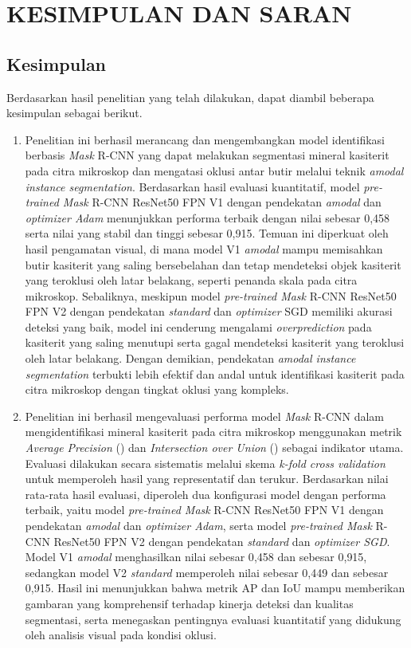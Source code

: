 \newpage
\chapter{KESIMPULAN DAN SARAN} \label{Bab V}

\section{Kesimpulan} \label{V.Kesimpulan}
Berdasarkan hasil penelitian yang telah dilakukan, dapat diambil beberapa kesimpulan sebagai berikut.

\begin{enumerate}[noitemsep]
    \item Penelitian ini berhasil merancang dan mengembangkan model identifikasi berbasis \textit{Mask} R-CNN yang dapat melakukan segmentasi mineral kasiterit pada citra mikroskop dan mengatasi oklusi antar butir melalui teknik \textit{amodal instance segmentation}. Berdasarkan hasil evaluasi kuantitatif, model \textit{pre-trained Mask} R-CNN ResNet50 FPN V1 dengan pendekatan \textit{amodal} dan \textit{optimizer Adam} menunjukkan performa terbaik dengan nilai \APrangefiftyy sebesar 0{,}458 serta nilai \IoUrangefiftyy yang stabil dan tinggi sebesar 0{,}915. Temuan ini diperkuat oleh hasil pengamatan visual, di mana model V1 \textit{amodal} mampu memisahkan butir kasiterit yang saling bersebelahan dan tetap mendeteksi objek kasiterit yang teroklusi oleh latar belakang, seperti penanda skala pada citra mikroskop. Sebaliknya, meskipun model \textit{pre-trained Mask} R-CNN ResNet50 FPN V2 dengan pendekatan \textit{standard} dan \textit{optimizer} SGD memiliki akurasi deteksi yang baik, model ini cenderung mengalami \textit{overprediction} pada kasiterit yang saling menutupi serta gagal mendeteksi kasiterit yang teroklusi oleh latar belakang. Dengan demikian, pendekatan \textit{amodal instance segmentation} terbukti lebih efektif dan andal untuk identifikasi kasiterit pada citra mikroskop dengan tingkat oklusi yang kompleks.
    \item Penelitian ini berhasil mengevaluasi performa model \textit{Mask} R-CNN dalam mengidentifikasi mineral kasiterit pada citra mikroskop menggunakan metrik \textit{Average Precision} (\APrangefiftyy) dan \textit{Intersection over Union} (\IoUrangefiftyy) sebagai indikator utama. Evaluasi dilakukan secara sistematis melalui skema \textit{k-fold cross validation} untuk memperoleh hasil yang representatif dan terukur. Berdasarkan nilai rata-rata hasil evaluasi, diperoleh dua konfigurasi model dengan performa terbaik, yaitu model \textit{pre-trained Mask} R-CNN ResNet50 FPN V1 dengan pendekatan \textit{amodal} dan \textit{optimizer Adam}, serta model \textit{pre-trained Mask} R-CNN ResNet50 FPN V2 dengan pendekatan \textit{standard} dan \textit{optimizer SGD}. Model V1 \textit{amodal} menghasilkan nilai \APrangefiftyy sebesar 0{,}458 dan \IoUrangefiftyy sebesar 0{,}915, sedangkan model V2 \textit{standard} memperoleh nilai \APrangefiftyy sebesar 0{,}449 dan \IoUrangefiftyy sebesar 0{,}915. Hasil ini menunjukkan bahwa metrik AP dan IoU mampu memberikan gambaran yang komprehensif terhadap kinerja deteksi dan kualitas segmentasi, serta menegaskan pentingnya evaluasi kuantitatif yang didukung oleh analisis visual pada kondisi oklusi.

\end{enumerate}
